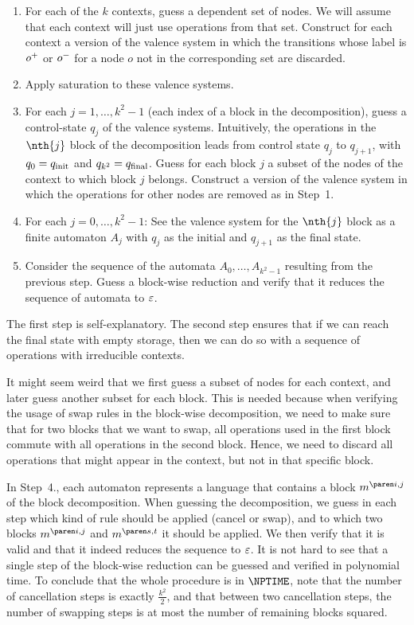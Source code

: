 \documentclass[../../diss.tex]{subfiles}
\begin{document}
\begin{enumerate}
    \item
        For each of the $k$ contexts, guess a dependent set of nodes.
        We will assume that each context will just use operations from that set.
        Construct for each context a version of the valence system in which the transitions whose label is ${o}^+$ or ${o}^-$ for a node $o$ not in the corresponding set are discarded.
    \item
        Apply saturation to these valence systems.
    \item
        For each $j = 1, \ldots, k^2-1$ (each index of a block in the decomposition), guess a control-state $q_j$ of the valence systems.
        Intuitively, the operations in the $\nth{j}$ block of the decomposition leads from control state $q_j$ to $q_{j+1}$, with $q_0 = q_{\text{init}}$ and $q_{k^2} = q_{\text{final}}$.
        Guess for each block $j$ a subset of the nodes of the context to which block $j$ belongs.
        Construct a version of the valence system in which the operations for other nodes are removed as in Step~1.
    \item
        For each $j = 0, \ldots, k^2-1$:
        See the valence system for the $\nth{j}$ block as a finite automaton $A_j$ with $q_j$ as the initial and $q_{j+1}$ as the final state.
    \item
        Consider the sequence of the automata $A_0, \ldots, A_{k^2-1}$ resulting from the previous step.
        Guess a block-wise reduction and verify that it reduces the sequence of automata to $\varepsilon$.
\end{enumerate}

The first step is self-explanatory.
The second step ensures that if we can reach the final state with empty storage, then we can do so with a sequence of operations with irreducible contexts.

It might seem weird that we first guess a subset of nodes for each context, and later guess another subset for each block.
This is needed because when verifying the usage of swap rules in the block-wise decomposition, we need to make sure that for two blocks that we want to swap, all operations used in the first block commute with all operations in the second block.
Hence, we need to discard all operations that might appear in the context, but not in that specific block.

In Step~4., each automaton represents a language that contains a block $\itr{m}{i,j}$ of the block decomposition.
When guessing the decomposition, we guess in each step which kind of rule should be applied (cancel or swap), and to which two blocks $\itr{m}{i,j}$ and $\itr{m}{s,t}$ it should be applied.
We then verify that it is valid and that it indeed reduces the sequence to $\varepsilon$.
It is not hard to see that a single step of the block-wise reduction can be guessed and verified in polynomial time.
To conclude that the whole procedure is in $\NPTIME$, note that the number of cancellation steps is exactly $\frac{k^2}{2}$, and that between two cancellation steps, the number of swapping steps is at most the number of remaining blocks squared.
\end{document}
